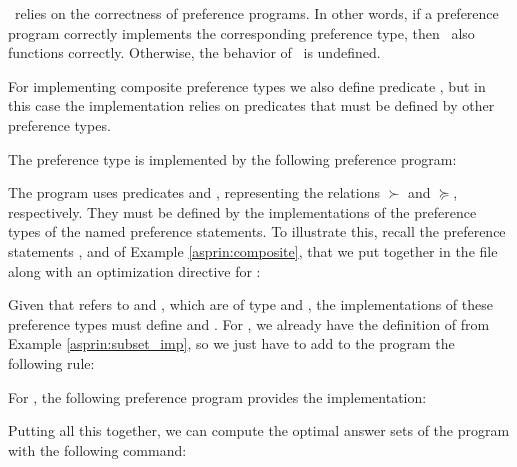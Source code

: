 \begin{note}
\asprin\ relies on the correctness of preference programs. 
In other words, 
if a preference program correctly implements the corresponding preference type,
then \asprin\ also functions correctly.
Otherwise, the behavior of \asprin\ is undefined.
\end{note}

For implementing composite preference types
we also define predicate ,
but in this case the implementation relies on predicates 
that must be defined by other preference types.

\begin{example}
The preference type  is implemented by the following preference program:
%

%
The program uses predicates  and ,
representing the relations $\succ$ and $\succeq$, respectively. 
They must be defined by the implementations of the preference types of the named preference statements.
To illustrate this, recall the preference statements ,  and  of Example \ref{asprin:composite}, 
that we put together in the file  along with an optimization directive for :
%

%
Given that  refers to  and , which are of type  and , 
the implementations of these preference types must define  and .
For , we already have the definition of  from Example \ref{asprin:subset_imp}, 
so we just have to add to the program  the following rule:
%

%
For , the following preference program provides the implementation:
%

%
Putting all this together, we can compute the optimal answer sets of the program
with the following command:
\end{example}
